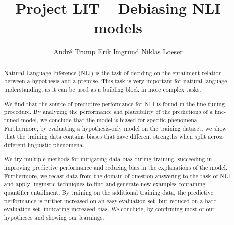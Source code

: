 \documentclass[11pt]{article}
\title{Project LIT -- Debiasing \acs{NLI} models}
\author{André Trump \And
  Erik Imgrund \And
  Niklas Loeser }
\begin{document}


\maketitle
\begin{abstract}
Natural Language Inference (NLI) is the task of deciding on the entailment relation between a hypothesis and a premise. This task is very important for natural language understanding, as it can be used as a building block in more complex tasks. 

We find that the source of predictive performance for \acs{NLI} is found in the fine-tuning procedure. By analyzing the performance and plausibility of the predictions of a fine-tuned model, we conclude that the model is biased for specific phenomena. Furthermore, by evaluating a hypothesis-only model on the training dataset, we show that the training data contains biases that have different strengths when split across different linguistic phenomena.

We try multiple methods for mitigating data bias during training, succeeding in improving predictive performance and reducing bias in the explanations of the model. Furthermore, we recast data from the domain of question answering to the task of \acs{NLI} and apply linguistic techniques to find and generate new examples containing quantifier entailment. By training on the additional training data, the predictive performance is further increased on an easy evaluation set, but reduced on a hard evaluation set, indicating increased bias. We conclude, by confirming most of our hypotheses and showing our learnings.
\end{abstract}







\FloatBarrier



\FloatBarrier
\appendix

\end{document}
